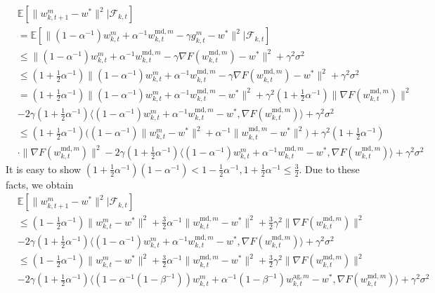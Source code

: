 \begin{align*}
    &\mathbb{E}[\|w_{k, t+1}^m-w^*\|^2|\mathcal{F}_{k, t}] \\
    &= \mathbb{E}[\|(1-\alpha^{-1})w_{k, t}^m + \alpha^{-1}w_{k, t}^{\textrm{md}, m} - \gamma g_{k, t}^m -w^*\|^2|\mathcal{F}_{k, t}] \\
    &\leq \|(1-\alpha^{-1})w_{k, t}^m + \alpha^{-1}w_{k, t}^{\textrm{md}, m} - \gamma\nabla F(w_{k, t}^{\textrm{md}, m}) -w^*\|^2 +\gamma^2\sigma^2 \\
    &\leq (1+\frac{1}{2}\alpha^{-1})\|(1-\alpha^{-1})w_{k, t}^m + \alpha^{-1}w_{k, t}^{\textrm{md}, m} - \gamma\nabla F(w_{k, t}^{\textrm{md}, m}) -w^*\|^2 +\gamma^2\sigma^2 \\
    &= (1+\frac{1}{2}\alpha^{-1})\|(1-\alpha^{-1})w_{k, t}^m + \alpha^{-1}w_{k, t}^{\textrm{md}, m} - w^*\|^2 + \gamma^2(1+\frac{1}{2}\alpha^{-1}) \|\nabla F(w_{k, t}^{\textrm{md}, m})\|^2 \\
    &- 2\gamma(1+\frac{1}{2}\alpha^{-1}) \langle (1-\alpha^{-1})w_{k, t}^m + \alpha^{-1}w_{k, t}^{\textrm{md}, m} - w^*, \nabla F(w_{k, t}^{\textrm{md}, m})\rangle + \gamma^2\sigma^2 \\
    &\leq (1+\frac{1}{2}\alpha^{-1})\Big((1-\alpha^{-1})\|w_{k, t}^m - w^*\|^2 + \alpha^{-1}\|w_{k, t}^{\textrm{md}, m} - w^*\|^2\Big) + \gamma^2(1+\frac{1}{2}\alpha^{-1}) \\
    &\cdot \|\nabla F(w_{k, t}^{\textrm{md}, m})\|^2  - 2\gamma(1+\frac{1}{2}\alpha^{-1}) \langle (1-\alpha^{-1})w_{k, t}^m + \alpha^{-1}w_{k, t}^{\textrm{md}, m} - w^*, \nabla F(w_{k, t}^{\textrm{md}, m})\rangle + \gamma^2\sigma^2
\end{align*}
It is easy to show $(1+\frac{1}{2}\alpha^{-1})(1-\alpha^{-1}) < 1-\frac{1}{2}\alpha^{-1}, 1+\frac{1}{2}\alpha^{-1} \leq \frac{3}{2}$. Due to these facts, we obtain
\begin{align*}
    &\mathbb{E}[\|w_{k, t+1}^m-w^*\|^2|\mathcal{F}_{k, t}] \\
    &\leq (1-\frac{1}{2}\alpha^{-1})\|w_{k, t}^m - w^*\|^2 + \frac{3}{2}\alpha^{-1}\|w_{k, t}^{\textrm{md}, m} - w^*\|^2 + \frac{3}{2}\gamma^2 \|\nabla F(w_{k, t}^{\textrm{md}, m})\|^2 \\
    &- 2\gamma(1+\frac{1}{2}\alpha^{-1}) \langle (1-\alpha^{-1})w_{k, t}^m + \alpha^{-1}w_{k, t}^{\textrm{md}, m} - w^*, \nabla F(w_{k, t}^{\textrm{md}, m})\rangle + \gamma^2\sigma^2 \\
    &\leq (1-\frac{1}{2}\alpha^{-1})\|w_{k, t}^m - w^*\|^2 + \frac{3}{2}\alpha^{-1}\|w_{k, t}^{\textrm{md}, m} - w^*\|^2 + \frac{3}{2}\gamma^2 \|\nabla F(w_{k, t}^{\textrm{md}, m})\|^2 \\
    &- 2\gamma(1+\frac{1}{2}\alpha^{-1}) \langle (1-\alpha^{-1}(1-\beta^{-1}))w_{k, t}^m + \alpha^{-1}(1-\beta^{-1})w_{k, t}^{\textrm{ag}, m} - w^*, \nabla F(w_{k, t}^{\textrm{md}, m})\rangle + \gamma^2\sigma^2
\end{align*}
